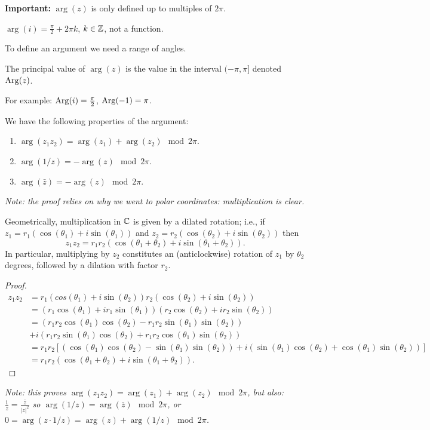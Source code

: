 \documentclass[10pt, a4paper]{article}
\begin{document}
\textbf{Important:}
$\arg(z)$ is only defined up to multiples of $2\pi$.

$\arg(i) = \frac{\pi}{2} + 2\pi k$,
$k \in \mathbb{Z}$,
not a function.

To define an argument we need a range of angles.

The principal value of $\arg(z)$ is the value in the interval $(-\pi, \pi]$ denoted $\operatorname{Arg}(z)$.

For example:
$\operatorname{Arg}(i) = \frac{\pi}{2}$,
$\operatorname{Arg}(-1) = \pi$.

\begin{lemma}
    We have the following properties of the argument:
    
    \begin{enumerate}[label = (\roman*)]
        \item $\arg(z_1z_2) = \arg(z_1) + \arg(z_2)\mod{2\pi}$.

        \item $\arg(1 / z) = -\arg(z)\mod{2\pi}$.

        \item $\arg(\bar{z}) = -\arg(z)\mod{2\pi}$.
    \end{enumerate}
\end{lemma}
\textit{Note:
the proof relies on why we went to polar coordinates:
multiplication is clear.}

\begin{lemma}
    Geometrically,
    multiplication in $\mathbb{C}$ is given by a dilated rotation;
    i.e.,
    if $z_1 = r_1(\cos(\theta_1) + i\sin(\theta_1))$ and $z_2 = r_2(\cos(\theta_2) + i\sin(\theta_2))$ then
    \[
    z_1z_2 = r_1r_2(\cos(\theta_1 + \theta_2) + i\sin(\theta_1 + \theta_2)).
    \]
    In particular,
    multiplying by $z_2$ constitutes an
    (anticlockwise)
    rotation of $z_1$ by $\theta_2$ degrees,
    followed by a dilation with factor $r_2$.

    \begin{proof}
        \begin{align*}
            z_1z_2 &= r_1(cos(\theta_1) + i\sin(\theta_2))r_2(\cos(\theta_2) + i\sin(\theta_2)) \\
            &= (r_1\cos(\theta_1) + ir_1\sin(\theta_1))(r_2\cos(\theta_2) + ir_2\sin(\theta_2)) \\
            &= (r_1r_2\cos(\theta_1)\cos(\theta_2) - r_1r_2\sin(\theta_1)\sin(\theta_2)) \\
            &+ i(r_1r_2\sin(\theta_1)\cos(\theta_2) + r_1r_2\cos(\theta_1)\sin(\theta_2)) \\
            &= r_1r_2[(\cos(\theta_1)\cos(\theta_2) - \sin(\theta_1)\sin(\theta_2)) + i(\sin(\theta_1)\cos(\theta_2) + \cos(\theta_1)\sin(\theta_2))] \\
            &= r_1r_2(\cos(\theta_1 + \theta_2) + i\sin(\theta_1 + \theta_2)).
        \end{align*}
    \end{proof}
\end{lemma}
\textit{Note:
this proves $\arg(z_1z_2) = \arg(z_1) + \arg(z_2)\mod{2\pi}$,
but also:
$\frac{1}{z} = \frac{\bar{z}}{|z| ^ 2}$ so $\arg(1 / z) = \arg(\bar{z})\mod{2\pi}$,
or $0 = \arg(z \cdot 1 / z) = \arg(z) + \arg(1 / z)\mod{2\pi}$.}
\end{document}

